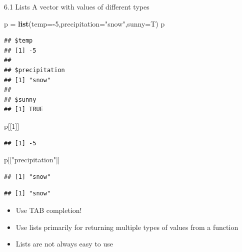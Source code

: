 \documentclass[
  ignorenonframetext,
]{beamer}
\newenvironment{Shaded}{\begin{snugshade}}{\end{snugshade}}
\newcommand{\AttributeTok}[1]{\textcolor[rgb]{0.13,0.29,0.53}{#1}}
\newcommand{\DecValTok}[1]{\textcolor[rgb]{0.00,0.00,0.81}{#1}}
\newcommand{\FunctionTok}[1]{\textcolor[rgb]{0.13,0.29,0.53}{\textbf{#1}}}
\newcommand{\NormalTok}[1]{#1}
\newcommand{\OtherTok}[1]{\textcolor[rgb]{0.56,0.35,0.01}{#1}}
\newcommand{\SpecialCharTok}[1]{\textcolor[rgb]{0.81,0.36,0.00}{\textbf{#1}}}
\newcommand{\StringTok}[1]{\textcolor[rgb]{0.31,0.60,0.02}{#1}}
\providecommand{\tightlist}{%
  \setlength{\itemsep}{0pt}\setlength{\parskip}{0pt}}
\begin{document}
\begin{frame}[fragile]{6.1 Lists}
\protect\hypertarget{lists}{}
A vector with values of different types

\begin{Shaded}
\begin{Highlighting}[]
\NormalTok{p }\OtherTok{=} \FunctionTok{list}\NormalTok{(}\AttributeTok{temp=}\SpecialCharTok{{-}}\DecValTok{5}\NormalTok{,}\AttributeTok{precipitation=}\StringTok{"snow"}\NormalTok{,}\AttributeTok{sunny=}\NormalTok{T)}
\NormalTok{p}
\end{Highlighting}
\end{Shaded}

\begin{verbatim}
## $temp
## [1] -5
## 
## $precipitation
## [1] "snow"
## 
## $sunny
## [1] TRUE
\end{verbatim}

\begin{Shaded}
\begin{Highlighting}[]
\NormalTok{p[[}\DecValTok{1}\NormalTok{]]}
\end{Highlighting}
\end{Shaded}

\begin{verbatim}
## [1] -5
\end{verbatim}

\begin{Shaded}
\begin{Highlighting}[]
\NormalTok{p[[}\StringTok{"precipitation"}\NormalTok{]]}
\end{Highlighting}
\end{Shaded}

\begin{verbatim}
## [1] "snow"
\end{verbatim}

\begin{Shaded}
\end{Shaded}

\begin{verbatim}
## [1] "snow"
\end{verbatim}

\begin{itemize}
\tightlist
\item
  Use TAB completion!
\item
  Use lists primarily for returning multiple types of values from a
  function
\item
  Lists are not always easy to use
\end{itemize}
\end{frame}
\end{document}
